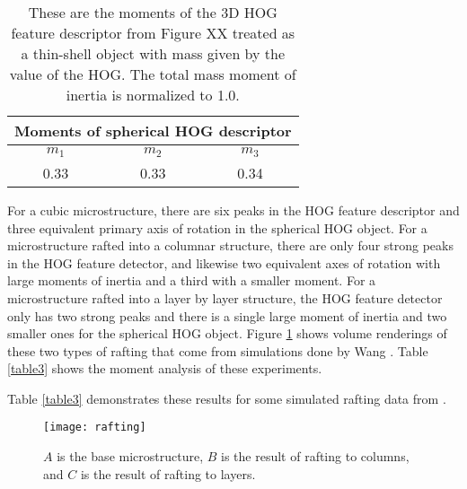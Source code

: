 \documentclass[review]{elsarticle}
\begin{document}
    
    \begin{table}[h]
      \begin{center}
      \begin{tabular}{ c | c | c }
        \multicolumn{3}{c}{Moments of spherical HOG descriptor} \\
        \hline
        $m_1$ & $m_2$ & $m_3$ \\
        \hline
        0.33 & 0.33 & 0.34 \\
        \hline
      \end{tabular}
	  \label{table4}
	  \caption{ These are the moments of the 3D HOG feature descriptor from Figure XX treated as a thin-shell object with mass given by the value of the HOG. The total mass moment of inertia is normalized to 1.0. }
	  \end{center}
  	\end{table}
	
	For a cubic microstructure, there are six peaks in the HOG feature descriptor and three equivalent primary axis of rotation in the spherical HOG object. For a microstructure rafted into a columnar structure, there are only four strong peaks in the HOG feature detector, and likewise two equivalent axes of rotation with large moments of inertia and a third with a smaller moment. For a microstructure rafted into a layer by layer structure, the HOG feature detector only has two strong peaks and there is a single large moment of inertia and two smaller ones for the spherical HOG object. Figure \ref{figure5} shows volume renderings of these two types of rafting that come from simulations done by Wang \cite{ywang2}. Table \ref{table3} shows the moment analysis of these experiments.
	
	Table \ref{table3} demonstrates these results for some simulated rafting data from \cite{ywang2}.
	
	\begin{figure}[!ht]
  		\centering
    	\texttt{[image: rafting]}
  		\caption{ $A$ is the base microstructure, $B$ is the result of rafting to columns, and $C$ is the result of rafting to layers. }
  		\label{figure5}
	\end{figure}
	
\end{document}
